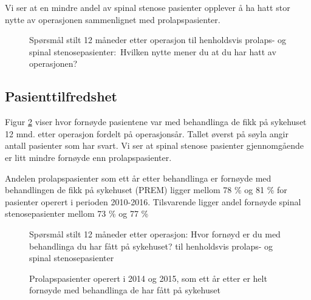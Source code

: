 \documentclass [norsk,a4paper,twoside]{article}\usepackage[]{graphicx}\usepackage[]{color}
\begin{document}
Vi ser at en mindre andel av spinal stenose pasienter opplever å ha hatt stor nytte av operasjonen sammenlignet 
med prolapspasienter.



\begin{figure}[h] 
\begin{center}
\end{center}
\caption{Spørsmål stilt 12 måneder etter operasjon til henholdsvis prolaps- og spinal stenosepasienter$:$ Hvilken nytte mener du at du har hatt av operasjonen?}
\label{fig:Nytte}
\end{figure}

\subsection{Pasienttilfredshet}

Figur \ref{fig:Fornoyd} viser hvor fornøyde pasientene var med behandlinga de fikk på sykehuset 12 mnd. 
etter operasjon fordelt på operasjonsår. Tallet øverst på søyla angir antall pasienter som har svart. 
Vi ser at spinal stenose pasienter gjennomgående er litt mindre fornøyde enn prolapspasienter.

Andelen prolapspasienter som ett år etter behandlinga er fornøyde med behandlingen de fikk på sykehuset (PREM) ligger mellom 78 \% og 81 \% for pasienter operert i perioden 2010-2016. 
Tilsvarende ligger andel fornøyde spinal stenosepasienter mellom 73 \% og 77 \%






\begin{figure}[h] 
\begin{center}
\end{center}
\caption{Spørsmål stilt 12 måneder etter operasjon: Hvor fornøyd er du med behandlinga du har fått på sykehuset? til henholdsvis prolaps- og spinal stenosepasienter}
\label{fig:Fornoyd}
\end{figure}

\begin{figure}[h] 
\caption{Prolapspasienter operert i 2014 og 2015, som ett år etter er helt fornøyde med behandlinga de har fått på sykehuset}
\label{fig:FornoydAvdPro}
\end{figure}
\end{document}
